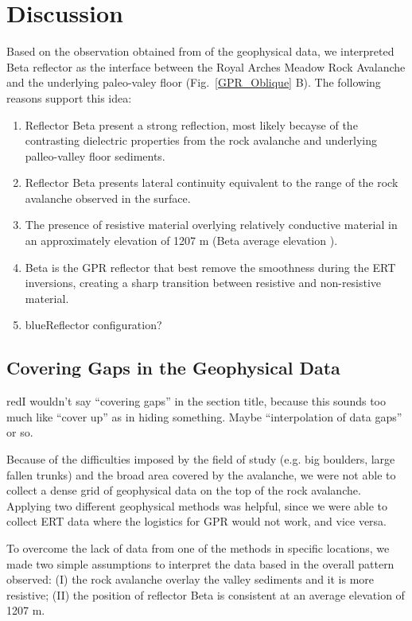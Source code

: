 \documentclass[utf8]{frontiersSCNS}
\newcommand{\COMON}{\begin{color}{blue}}
\newcommand{\COMOFF}{\end{color}}
\newcommand{\alon}{\begin{color}{red}}
\newcommand{\aloff}{\end{color}}
\begin{document}


\section{Discussion}

Based on the observation obtained from of the geophysical data, we interpreted Beta reflector as the interface between the Royal Arches Meadow Rock Avalanche and the underlying paleo-valey floor (Fig.~\ref{GPR_Oblique} B). The following reasons support this idea: 

\begin{enumerate}[I]
\item Reflector Beta present a strong reflection, most likely becayse of the contrasting dielectric properties from the rock avalanche and underlying palleo-valley floor sediments. 
\item Reflector Beta presents lateral continuity equivalent to the range of the rock avalanche observed in the surface.  
\item The presence of resistive material overlying relatively conductive material in an approximately elevation of 1207 m (Beta average elevation ). 
\item Beta is the GPR reflector that best remove the smoothness during the ERT inversions, creating a sharp transition between resistive and non-resistive material.
\item  \COMON Reflector configuration? \COMOFF 
\end{enumerate}



\subsection{Covering Gaps in the Geophysical Data}

\alon I wouldn't say ``covering gaps'' in the section title, because this sounds too much like ``cover up'' as in hiding something. Maybe ``interpolation of data gaps'' or so. \aloff
Because of the difficulties imposed by the field of study (e.g. big boulders,  large fallen trunks) and the broad area covered by the avalanche, we were not able to collect a dense grid of geophysical data on the top of the rock avalanche. Applying two different geophysical methods was helpful, since we were able to collect ERT data where the logistics for GPR would not work, and vice versa. 

To overcome the lack of data from one of the methods in specific locations, we made two simple assumptions to interpret the data based in the overall pattern observed: (I) the rock avalanche overlay the valley sediments and it is more resistive; (II) the position of reflector Beta is consistent at an average elevation of 1207 m.  
\end{document}
